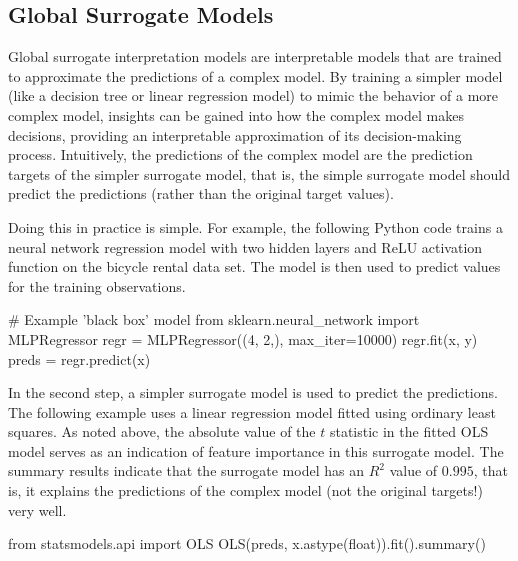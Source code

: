\subsection{Global Surrogate Models}

Global surrogate interpretation models are interpretable models that are trained to approximate the predictions of a complex model. By training a simpler model (like a decision tree or linear regression model) to mimic the behavior of a more complex model, insights can be gained into how the complex model makes decisions, providing an interpretable approximation of its decision-making process. Intuitively, the predictions of the complex model are the prediction targets of the simpler surrogate model, that is, the simple surrogate model should predict the predictions (rather than the original target values).

\begin{withcode}
Doing this in practice is simple. For example, the following Python code trains a neural network regression model with two hidden layers and ReLU activation function on the bicycle rental data set. The model is then used to predict values for the training observations.

\begin{pythoncode}
# Example 'black box' model
from sklearn.neural_network import MLPRegressor
regr = MLPRegressor((4, 2,), max_iter=10000)
regr.fit(x, y)
preds = regr.predict(x)
\end{pythoncode}

In the second step, a simpler surrogate model is used to predict the predictions. The following example uses a linear regression model fitted using ordinary least squares. As noted above, the absolute value of the $t$ statistic in the fitted OLS model serves as an indication of feature importance in this surrogate model. The summary results indicate that the surrogate model has an $R^2$ value of $0.995$, that is, it explains the predictions of the complex model (not the original targets!) very well. 

\begin{pythoncode}
from statsmodels.api import OLS
OLS(preds, x.astype(float)).fit().summary()
\end{pythoncode}
\end{withcode}

